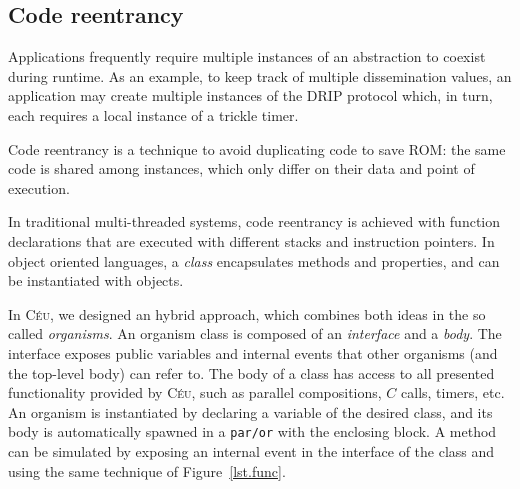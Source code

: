 \documentclass[10pt]{sensys-proc}
\newcommand{\CEU}{\textsc{C\'{e}u}\xspace}
\newcommand{\code}[1] {{\small{\texttt{#1}}}}
\begin{document}
\subsection{Code reentrancy}
\label{sec.ceu.oo}

Applications frequently require multiple instances of an abstraction to coexist 
during runtime.
As an example, to keep track of multiple dissemination values, an application 
may create multiple instances of the DRIP protocol which, in turn, each 
requires a local instance of a trickle timer.

Code reentrancy is a technique to avoid duplicating code to save ROM:
the same code is shared among instances, which only differ on their data and
point of execution.

In traditional multi-threaded systems, code reentrancy is achieved with 
function declarations that are executed with different stacks and instruction 
pointers.
In object oriented languages, a \emph{class} encapsulates methods and 
properties, and can be instantiated with objects.

In \CEU, we designed an hybrid approach, which combines both ideas in the so 
called \emph{organisms}.
An organism class is composed of an \emph{interface} and a \emph{body}.
The interface exposes public variables and internal events that other organisms 
(and the top-level body) can refer to.
The body of a class has access to all presented functionality provided by \CEU, 
such as parallel compositions, $C$ calls, timers, etc.
An organism is instantiated by declaring a variable of the desired class, and 
its body is automatically spawned in a \code{par/or} with the enclosing block.
A method can be simulated by exposing an internal event in the interface of the 
class and using the same technique of Figure~\ref{lst.func}.
\end{document}
